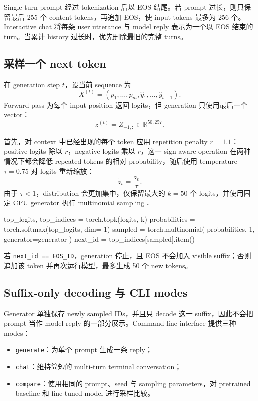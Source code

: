 \documentclass[12pt]{article}
\newcommand{\RSpace}{\mathbb R}
\begin{document}
Single-turn prompt 经过 tokenization 后以 EOS 结尾。若 prompt 过长，则只保留最后 255 个 content tokens，再追加 EOS，使 input tokens 最多为 256 个。Interactive chat 将每条 user utterance 与 model reply 表示为一个以 EOS 结束的 turn。当累计 history 过长时，优先删除最旧的完整 turns。

\subsection{采样一个 next token}

在 generation step $t$，设当前 sequence 为
\[
X^{(t)}=(p_1,\ldots,p_m,\hat y_1,\ldots,\hat y_{t-1}).
\]
Forward pass 为每个 input position 返回 logits，但 generation 只使用最后一个 vector：
\[
z^{(t)}=Z_{-1,:}\in\RSpace^{50{,}257}.
\]

首先，对 context 中已经出现的每个 token 应用 repetition penalty $r=1.1$：positive logits 除以 $r$，negative logits 乘以 $r$，这一 sign-aware operation 在两种情况下都会降低 repeated tokens 的相对 probability，随后使用 temperature $\tau=0.75$ 对 logits 重新缩放：
\[
\widetilde z_v=\frac{z_v}{\tau}.
\]
由于 $\tau<1$，distribution 会更加集中，仅保留最大的 $k=50$ 个 logits，并使用固定 CPU generator 执行 multinomial sampling：
\begin{pythoncode}[label={lst:sampling}]
top_logits, top_indices = torch.topk(logits, k)
probabilities = torch.softmax(top_logits, dim=-1)
sampled = torch.multinomial(
    probabilities, 1, generator=generator
)
next_id = top_indices[sampled].item()
\end{pythoncode}
若 \texttt{next\_id == EOS\_ID}，generation 停止，且 EOS 不会加入 visible suffix；否则追加该 token 并再次运行模型，最多生成 50 个 new tokens。

\subsection{Suffix-only decoding 与 CLI modes}

Generator 单独保存 newly sampled IDs，并且只 decode 这一 suffix，因此不会把 prompt 当作 model reply 的一部分展示。Command-line interface 提供三种 modes：
\begin{itemize}
  \item \texttt{generate}：为单个 prompt 生成一条 reply；
  \item \texttt{chat}：维持简短的 multi-turn terminal conversation；
  \item \texttt{compare}：使用相同的 prompt、seed 与 sampling parameters，对 pretrained baseline 和 fine-tuned model 进行采样比较。
\end{itemize}
\end{document}

